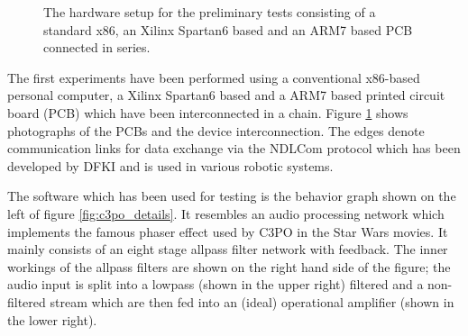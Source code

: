 \documentclass[a4paper,twocolumn]{esapub2005} %
\begin{document}
\begin{figure}
\caption{
The hardware setup for the preliminary tests
consisting of a standard x86, an Xilinx Spartan6 based and an ARM7 based PCB connected in series.
}
\label{fig:prelim_hw_arch}
\end{figure}

The first experiments have been performed using a conventional x86-based personal computer,
a Xilinx Spartan6 based and a ARM7 based printed circuit board (PCB) which have been interconnected in a chain.
Figure \ref{fig:prelim_hw_arch} shows photographs of the PCBs and the device interconnection.
The edges denote communication links for data exchange via the NDLCom protocol which has been developed by DFKI
and is used in various robotic systems.

The software which has been used for testing is the behavior graph shown on the left of figure \ref{fig:c3po_details}.
It resembles an audio processing network which implements the famous phaser effect used by C3PO in the Star Wars movies.
It mainly consists of an eight stage allpass filter network with feedback.
The inner workings of the allpass filters are shown on the right hand side of the figure;
the audio input is split into a lowpass (shown in the upper right) filtered and a non-filtered stream which are then
fed into an (ideal) operational amplifier (shown in the lower right).
\end{document}
